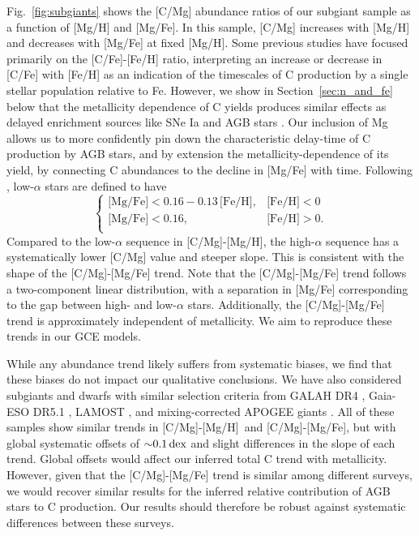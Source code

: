\documentclass[fleqn,
usenatbib]{mnras}
\newcommand{\caah}{[C/Mg]-[Mg/H]}
\newcommand{\caafe}{[C/Mg]-[Mg/Fe]}
\begin{document}
Fig.~\ref{fig:subgiants} shows the [C/Mg] abundance ratios of our subgiant sample as a function of [Mg/H] and [Mg/Fe].\footnotemark{} In this sample, [C/Mg] increases with [Mg/H] and decreases with [Mg/Fe] at fixed [Mg/H].
Some previous studies \citep[e.g.,][]{tinsley79, KKU11, KKL20} have focused primarily on the [C/Fe]-[Fe/H] ratio, interpreting an increase or decrease in [C/Fe] with [Fe/H] as an indication of the timescales of C production by a single stellar population relative to Fe. However, we show in Section~\ref{sec:n_and_fe} below that the metallicity dependence of C yields produces similar effects as delayed enrichment sources like SNe Ia and AGB stars \citep[see also][]{romano22}. Our inclusion of Mg allows us to more confidently pin down the characteristic delay-time of C production by AGB stars, and by extension the metallicity-dependence of its yield, by connecting C abundances to the decline in [Mg/Fe] with time.
Following \citet[eq.~1]{jack}, low-$\alpha$ stars are defined to have 
\begin{equation}\label{eq:high_alpha}
\begin{cases}
\text{[Mg/Fe]} <0.16-0.13\,\text{[Fe/H]}, & \text{[Fe/H]}<0\\
\text{[Mg/Fe]} <0.16, & \text{[Fe/H]}>0. \\
\end{cases}
\end{equation}
Compared to the low-$\alpha$ sequence in \caah, the high-$\alpha$ sequence has a systematically lower [C/Mg] value and steeper slope. This is consistent with the shape of the \caafe{} trend.
Note that the \caafe{} trend follows a two-component linear distribution, with a separation in [Mg/Fe] corresponding to the gap between high- and low-$\alpha$ stars. Additionally, the \caafe{} trend is approximately independent of metallicity. We aim to reproduce these trends in our GCE models.


While any abundance trend likely suffers from systematic biases, we find that these biases do not impact our qualitative conclusions. 
We have also considered subgiants and dwarfs with similar selection criteria from GALAH DR4 \citep{galah_dr4}, Gaia-ESO DR5.1 \citep{gaiaeso_dr5.1}, LAMOST \citep{lamost}, and mixing-corrected APOGEE giants \citep{vincenzo+21}. 
All of these samples show similar trends in \caah\ and \caafe{}, but with global systematic offsets of ${\sim} 0.1\,{\rm dex}$ and slight differences in the slope of each trend. Global offsets would affect our inferred total C trend with metallicity. However, given that the \caafe{} trend is similar among different surveys, we would recover similar results for the inferred relative contribution of AGB stars to C production. Our results should therefore be robust against systematic differences between these surveys.
\end{document}
